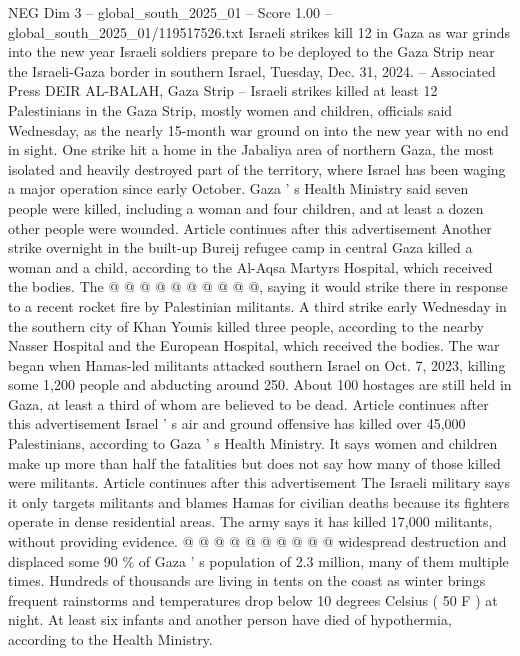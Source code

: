 \begin{textsample}{NEG Dim 3 – global\_south\_2025\_01 – Score 1.00 – global\_south\_2025\_01/119517526.txt}  \label{ex:f3_neg_077}
Israeli strikes kill 12 in Gaza as war grinds into the new year Israeli soldiers prepare to be deployed to the Gaza Strip near the Israeli-Gaza border in southern Israel, Tuesday, Dec. 31, 2024. -- Associated Press DEIR AL-BALAH, Gaza Strip -- Israeli strikes killed at least 12 Palestinians in the Gaza Strip, mostly women and children, officials said Wednesday, as the nearly 15-month war ground on into the new year with no end in sight.
One strike hit a home in the Jabaliya area of northern Gaza, the most isolated and heavily destroyed part of the territory, where Israel has been waging a major operation since early October.
Gaza ' s Health Ministry said seven people were killed, including a woman and four children, and at least a dozen other people were wounded.
Article continues after this advertisement Another strike overnight in the built-up Bureij refugee camp in central Gaza killed a woman and a child, according to the Al-Aqsa Martyrs Hospital, which received the bodies.
The @ @ @ @ @ @ @ @ @ @, saying it would strike there in response to a recent rocket fire by Palestinian militants.
A third strike early Wednesday in the southern city of Khan Younis killed three people, according to the nearby Nasser Hospital and the European Hospital, which received the bodies.
The war began when Hamas-led militants attacked southern Israel on Oct. 7, 2023, killing some 1,200 people and abducting around 250.
About 100 hostages are still held in Gaza, at least a third of whom are believed to be dead.
Article continues after this advertisement Israel ' s air and ground offensive has killed over 45,000 Palestinians, according to Gaza ' s Health Ministry.
It says women and children make up more than half the fatalities but does not say how many of those killed were militants.
Article continues after this advertisement The Israeli military says it only targets militants and blames Hamas for civilian deaths because its fighters operate in dense residential areas.
The army says it has killed 17,000 militants, without providing evidence. @ @ @ @ @ @ @ @ @ @ widespread destruction and displaced some 90 \% of Gaza ' s population of 2.3 million, many of them multiple times.
Hundreds of thousands are living in tents on the coast as winter brings frequent rainstorms and temperatures drop below 10 degrees Celsius ( 50 F ) at night.
At least six infants and another person have died of hypothermia, according to the Health Ministry.

\end{textsample}
